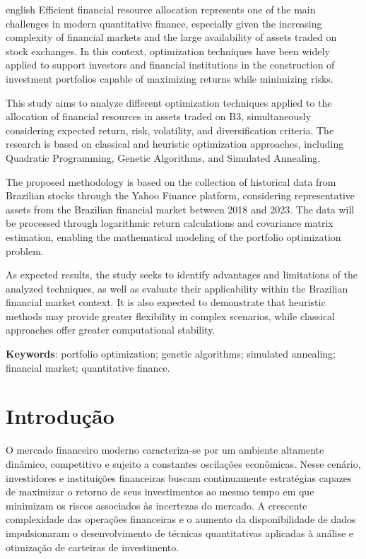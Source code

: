 ﻿\documentclass[
  12pt,
  oneside,
  a4paper,
  brazil
]{abntex2}
\begin{document}
\begin{resumo}[Abstract]
\begin{otherlanguage*}{english}
Efficient financial resource allocation represents one of the main challenges in modern quantitative finance, especially given the increasing complexity of financial markets and the large availability of assets traded on stock exchanges. In this context, optimization techniques have been widely applied to support investors and financial institutions in the construction of investment portfolios capable of maximizing returns while minimizing risks.

This study aims to analyze different optimization techniques applied to the allocation of financial resources in assets traded on B3, simultaneously considering expected return, risk, volatility, and diversification criteria. The research is based on classical and heuristic optimization approaches, including Quadratic Programming, Genetic Algorithms, and Simulated Annealing.

The proposed methodology is based on the collection of historical data from Brazilian stocks through the Yahoo Finance platform, considering representative assets from the Brazilian financial market between 2018 and 2023. The data will be processed through logarithmic return calculations and covariance matrix estimation, enabling the mathematical modeling of the portfolio optimization problem.

As expected results, the study seeks to identify advantages and limitations of the analyzed techniques, as well as evaluate their applicability within the Brazilian financial market context. It is also expected to demonstrate that heuristic methods may provide greater flexibility in complex scenarios, while classical approaches offer greater computational stability.

\textbf{Keywords}: portfolio optimization; genetic algorithms; simulated annealing; financial market; quantitative finance.
\end{otherlanguage*}
\end{resumo}

\textual

\chapter{Introdução}
O mercado financeiro moderno caracteriza-se por um ambiente altamente dinâmico, competitivo e sujeito a constantes oscilações econômicas. Nesse cenário, investidores e instituições financeiras buscam continuamente estratégias capazes de maximizar o retorno de seus investimentos ao mesmo tempo em que minimizam os riscos associados às incertezas do mercado. A crescente complexidade das operações financeiras e o aumento da disponibilidade de dados impulsionaram o desenvolvimento de técnicas quantitativas aplicadas à análise e otimização de carteiras de investimento.
\end{document}
